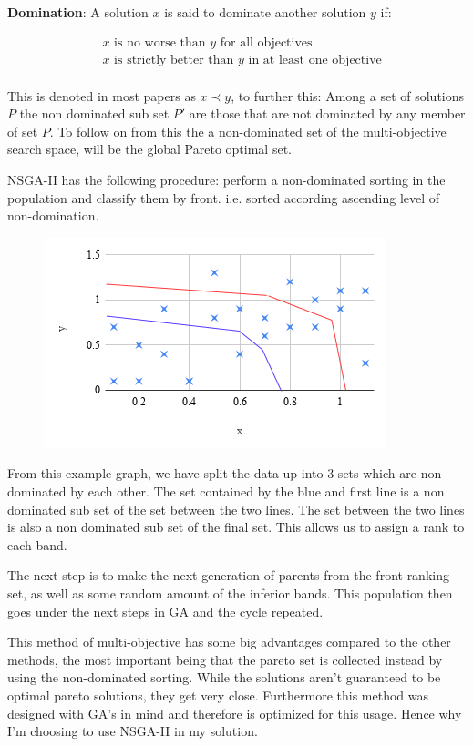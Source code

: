 \documentclass[11pt]{article}
\begin{document}
    \textbf{Domination}: A solution \(x\) is said to dominate another solution \(y\) if:

    \begin{align*}
        & x \text{ is no worse than } y \text{ for all objectives} \\
        & x \text{ is strictly better than } y \text{ in at least one objective} \\
    \end{align*}

    This is denoted in most papers as \(x \prec y\), to further this: Among a set of solutions \(P\)
    the non dominated sub set \(P'\) are those that are not dominated by any member of
    set \(P\). To follow on from this the a non-dominated set of the multi-objective search
    space, will be the global Pareto optimal set.

    NSGA-II has the following procedure: perform a non-dominated sorting in the population
    and classify them by front. i.e. sorted according ascending level of non-domination.

    \begin{figure}[H]
        \includegraphics{NSGArank}
    \end{figure}
    From this example graph, we have split the data up into 3 sets which are non-dominated
    by each other. The set contained by the blue and first line is a non dominated sub set
    of the set between the two lines. The set between the two lines is also a non dominated
    sub set of the final set. This allows us to assign a rank to each band.

    The next step is to make the next generation of parents from the front ranking
    set, as well as some random amount of the inferior bands. This population
    then goes under the next steps in GA and the cycle repeated.

    This method of multi-objective has some big advantages compared to the other methods,
    the most important being that the pareto set is collected instead by using the non-dominated
    sorting. While the solutions aren't guaranteed to be optimal pareto solutions, they
    get very close. Furthermore this method was designed with GA's in mind and therefore is
    optimized for this usage. Hence why I'm choosing to use NSGA-II in my solution.
\end{document}
